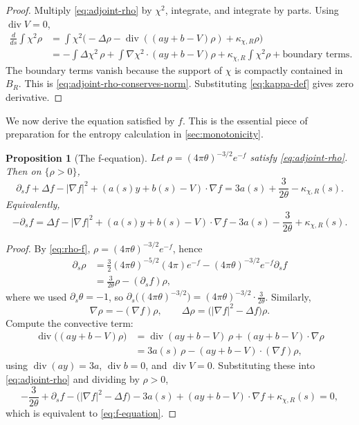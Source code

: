 \documentclass[11pt]{amsart}
\numberwithin{equation}{section}
\theoremstyle{plain}
\newtheorem{proposition}[theorem]{Proposition}
\theoremstyle{definition}
\theoremstyle{remark}
\newcommand{\diver}{\operatorname{div}}
\newcommand{\kappachi}{\kappa_{\chi,R}}
\begin{document}
\begin{proof}
Multiply \eqref{eq:adjoint-rho} by \(\chi^2\), integrate, and integrate by
parts.  Using \(\diver V=0\),
\[
\begin{aligned}
	\frac{d}{ds}\int\chi^2\rho
	&=\int\chi^2\bigl(-\Delta\rho-\diver((a y+b-V)\rho)+\kappachi\rho\bigr)\\
	&=-\int\Delta\chi^2\,\rho+\int\nabla\chi^2\cdot(a y+b-V)\rho
	+\kappachi\int\chi^2\rho+\text{boundary terms}.
\end{aligned}
\]
The boundary terms vanish because the support of \(\chi\) is compactly
contained in \(B_R\).  This is \eqref{eq:adjoint-rho-conserves-norm}.
Substituting \eqref{eq:kappa-def} gives zero derivative.
\end{proof}

We now derive the equation satisfied by \(f\).  This is the essential
piece of preparation for the entropy calculation in
\cref{sec:monotonicity}.

\begin{proposition}[The f-equation]
\label{prop:f-equation}
Let \(\rho=(4\pi\theta)^{-3/2}e^{-f}\) satisfy \eqref{eq:adjoint-rho}.
Then on \(\{\rho>0\}\),
\begin{equation}\label{eq:f-equation}
	\partial_s f+\Delta f-|\nabla f|^2+(a(s)y+b(s)-V)\cdot\nabla f
	=3a(s)+\frac{3}{2\theta}-\kappachi(s).
\end{equation}
Equivalently,
\begin{equation}\label{eq:f-equation-rewritten}
	-\partial_s f
	=\Delta f-|\nabla f|^2+(a(s)y+b(s)-V)\cdot\nabla f
	-3a(s)-\frac{3}{2\theta}+\kappachi(s).
\end{equation}
\end{proposition}

\begin{proof}
By \eqref{eq:rho-f}, \(\rho=(4\pi\theta)^{-3/2}e^{-f}\), hence
\[
\begin{aligned}
	\partial_s\rho
	&=\frac{3}{2}(4\pi\theta)^{-5/2}(4\pi)e^{-f}-(4\pi\theta)^{-3/2}e^{-f}\partial_s f\\
	&=\frac{3}{2\theta}\rho-(\partial_s f)\rho,
\end{aligned}
\]
where we used \(\partial_s\theta=-1\), so
\(\partial_s\bigl((4\pi\theta)^{-3/2}\bigr)
=(4\pi\theta)^{-3/2}\cdot\frac{3}{2\theta}\).  Similarly,
\[
\nabla\rho=-(\nabla f)\rho,\qquad
\Delta\rho=\bigl(|\nabla f|^2-\Delta f\bigr)\rho.
\]
Compute the convective term:
\[
\begin{aligned}
	\diver\bigl((a y+b-V)\rho\bigr)
	&=\diver(a y+b-V)\,\rho+(a y+b-V)\cdot\nabla\rho\\
	&=3a(s)\,\rho-(a y+b-V)\cdot(\nabla f)\rho,
\end{aligned}
\]
using \(\diver(a y)=3a\), \(\diver b=0\), and \(\diver V=0\).
Substituting these into \eqref{eq:adjoint-rho} and dividing by \(\rho>0\),
\[
	-\frac{3}{2\theta}+\partial_s f-\bigl(|\nabla f|^2-\Delta f\bigr)
	-3a(s)+(a y+b-V)\cdot\nabla f+\kappachi(s)=0,
\]
which is equivalent to \eqref{eq:f-equation}.
\end{proof}
\end{document}
